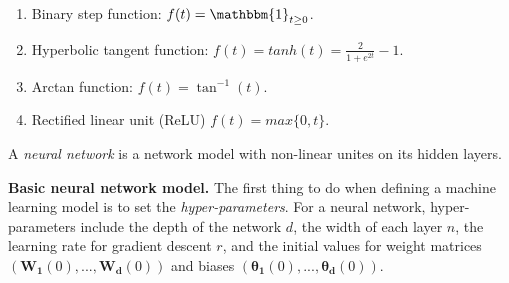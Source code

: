 \begin{enumerate}
\item
Binary step function: $f(t) = \mathbbm{1}_{t\ge 0}$.
\item
Hyperbolic tangent function: $f(t) = tanh(t)=\frac{2}{1+e^{2t}}-1$.
\item
Arctan function: $f(t) = \tan^{-1}(t)$.
\item
Rectified linear unit (ReLU) $f(t) = max\{0, t\}$.
\end{enumerate}

A \textit{neural network} is a network model with non-linear unites on its hidden layers.








{\bf Basic neural network model.} The first thing to do when defining a machine learning model is to set the \textit{hyper-parameters}.  For a neural network, hyper-parameters include the depth of the network $d$, the width of each layer $n$, the learning rate for gradient descent $r$, and the initial values for weight matrices $(\bm{W_1}(0),...,\bm{W_d}(0))$ and biases $(\bm{\theta_1}(0),...,\bm{\theta_d}(0))$. 

